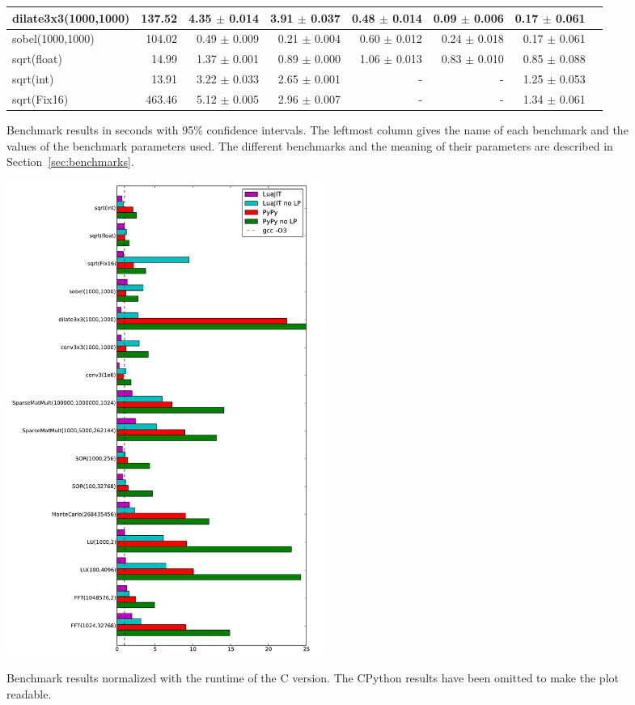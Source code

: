 \documentclass[preprint]{sigplanconf}
\begin{document}
\begin{figure}
\begin{center}
{\begin{tabular}{|l|r|r|r|r|r|r|r|}
dilate3x3(1000,1000) & 137.52 & 4.35 $\pm$ 0.014 & 3.91 $\pm$ 0.037 & 0.48 $\pm$ 0.014 & 0.09 $\pm$ 0.006 & 0.17 $\pm$ 0.061\\
\hline
sobel(1000,1000) & 104.02 & 0.49 $\pm$ 0.009 & 0.21 $\pm$ 0.004 & 0.60 $\pm$ 0.012 & 0.24 $\pm$ 0.018 & 0.17 $\pm$ 0.061\\
\hline
sqrt(float) & 14.99 & 1.37 $\pm$ 0.001 & 0.89 $\pm$ 0.000 & 1.06 $\pm$ 0.013 & 0.83 $\pm$ 0.010 & 0.85 $\pm$ 0.088\\
\hline
sqrt(int) & 13.91 & 3.22 $\pm$ 0.033 & 2.65 $\pm$ 0.001 & - & - & 1.25 $\pm$ 0.053\\
\hline
sqrt(Fix16) & 463.46 & 5.12 $\pm$ 0.005 & 2.96 $\pm$ 0.007 & - & - & 1.34 $\pm$ 0.061\\
\hline
\end{tabular}
}
\end{center}
\label{fig:benchmarks}
\caption{Benchmark results in seconds with 95\% confidence intervals. The leftmost column gives the
name of each benchmark and the values of the benchmark parameters used. The different benchmarks and the meaning of their parameters are described in Section~\ref{sec:benchmarks}.}
\end{figure}

\begin{figure}
\begin{center}
\includegraphics[width=0.5\textwidth]{benchmarks/result.pdf}
\label{fig:benchmarks_plot}
\caption{Benchmark results normalized with the runtime of the C version. The CPython results have been omitted to make the plot readable.}
\end{center}
\end{figure}
\end{document}
